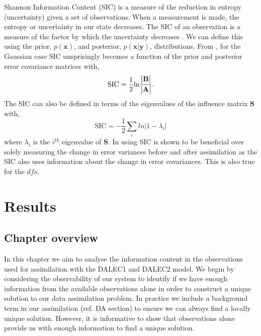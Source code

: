 \documentclass[11pt]{article}
\begin{document}
Shannon Information Content (SIC) is a measure of the reduction in entropy (uncertainty) given a set of observations. When a measurement is made, the entropy or uncertainty in our state decreases. The SIC of an observation is a measure of the factor by which the uncertainty decreases \citep{cover1991elements}. We can define this using the prior, $p(\textbf{x})$, and posterior, $p(\textbf{x}|\textbf{y})$, distributions. From \citet{rodgers2000inverse}, for the Gaussian case SIC unsprisingly becomes a function of the prior and posterior error covariance matrices with,
\begin{equation}
\text{SIC}=\frac{1}{2}\text{ln}\frac{\begin{vmatrix} \bf{B} \end{vmatrix}}{\begin{vmatrix} \bf{A} \end{vmatrix}}. \label{eqn:sic}
\end{equation}
The SIC can also be defined in terms of the eigenvalues of the influence matrix $\textbf{S}$ with,
\begin{equation}
\text{SIC} = -\frac{1}{2} \sum_{i} ln | 1 - \lambda_{i} |
\end{equation}
where $\lambda_{i}$ is the $i^{th}$ eigenvalue of $\textbf{S}$. In \citet{eyre1990information} using SIC is shown to be beneficial over solely measuring the change in error variances before and after assimilation as the SIC also uses information about the change in error covariances. This is also true for the $dfs$.   

\section{Results}

\subsection{Chapter overview}
In this chapter we aim to analyse the information content in the observations used for assimilation with the DALEC1 and DALEC2 model. We begin by considering the observability of our system to identify if we have enough information from the available observations alone in order to construct a unique solution to our data assimilation problem. In practice we include a background term in our assimilation ({\color{red}ref. DA section}) to ensure we can always find a locally unique solution. However, it is informative to show that observations alone provide us with enough information to find a unique solution.
\end{document}
